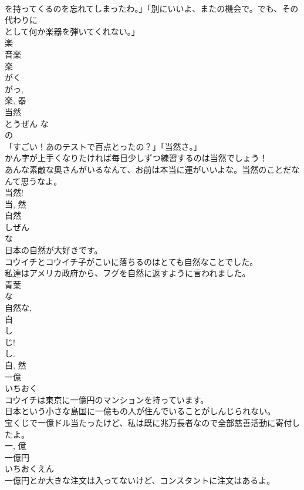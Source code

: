 \documentclass[8pt]{extreport}
\begin{document}
\begin{CJK}{UTF8}{min}
\\	を持ってくるのを忘れてしまったわ。」「別にいいよ、またの機会で。でも、その代わりに
\\	として何か楽器を弾いてくれない。」	
\\	楽 
\\	音楽 
\\	楽 
\\	がく 
\\	がっ, 
\\	楽, 器	
\\	当然	
\\	とうぜん	な 
\\	の 
\\	「すごい！あのテストで百点とったの？」「当然さ。」	
\\	かん字が上手くなりたければ毎日少しずつ練習するのは当然でしょう！	
\\	あんな素敵な奥さんがいるなんて、お前は本当に運がいいよな。当然のことだなんて思うなよ。	
\\	当然!	
\\	当, 然	
\\	自然	
\\	しぜん	
\\	な 
\\	日本の自然が大好きです。	
\\	コウイチとコウイチ子がこいに落ちるのはとても自然なことでした。	
\\	私達はアメリカ政府から、フグを自然に返すように言われました。	
\\	青葉 
\\	な 
\\	自然な, 
\\	自 
\\	し 
\\	じ! 
\\	し. 
\\	自, 然	
\\	一億	
\\	いちおく	
\\	コウイチは東京に一億円のマンションを持っています。	
\\	日本という小さな島国に一億もの人が住んでいることがしんじられない。	
\\	宝くじで一億ドル当たったけど、私は既に兆万長者なので全部慈善活動に寄付したよ。	
\\	一, 億	
\\	一億円	
\\	いちおくえん	
\\	一億円とか大きな注文は入ってないけど、コンスタントに注文はあるよ。	

\end{CJK}
\end{document}
